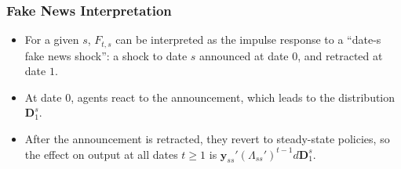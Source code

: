 \documentclass[english,xcolor=svgnames]{beamer}
\begin{document}
\begin{frame}
    \frametitle{Fake News Interpretation}
    \begin{itemize}
    	\item For a given $s$, $F_{t,s}$ can be interpreted as the impulse response to a ``date-s fake news shock'': a shock to date $s$ announced at date $0$, and retracted at date $1$.
    	\item At date $0$, agents react to the announcement, which leads to the distribution $\bm{D}_1^s$.
    	\item After the announcement is retracted, they revert to steady-state policies, so the effect on output at all dates $t\ge 1$ is $\bm{y}_{ss}' (\Lambda_{ss}')^{t-1}d\bm{D}_1^s$.
	\end{itemize}
\end{frame}




\end{document}
